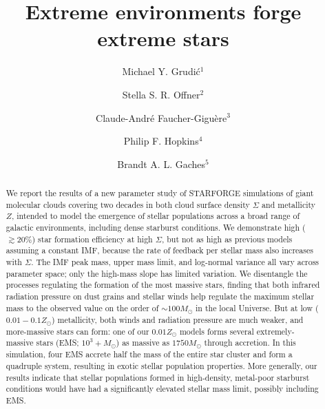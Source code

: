 \documentclass[apjl,twocolumn]{openjournal}
\begin{document}
\title{Extreme environments forge extreme stars}

\author{Michael Y. Grudi\'{c}$^{1}$}
\author{Stella S. R. Offner$^{2}$}
\author{Claude-Andr{\'e} Faucher-Gigu{\`e}re$^{3}$}
\author{Philip F. Hopkins$^{4}$}
\author{Brandt A. L. Gaches$^{5}$}



\begin{abstract}
We report the results of a new parameter study of \small{STARFORGE} simulations of giant molecular clouds covering two decades in both cloud surface density $\Sigma$ and metallicity $Z$, intended to model the emergence of stellar populations across a broad range of galactic environments, including dense starburst conditions. We demonstrate high ($\gtrsim 20\%$) star formation efficiency at high $\Sigma$, but not as high as previous models assuming a constant IMF, because the rate of feedback per stellar mass also increases with $\Sigma$. The IMF peak mass, upper mass limit, and log-normal variance all vary across parameter space; only the high-mass slope has limited variation. We disentangle the processes regulating the formation of the most massive stars, finding that both infrared radiation pressure on dust grains and stellar winds help regulate the maximum stellar mass to the observed value on the order of $\sim 100 M_\odot$ in the local Universe. But at low ($0.01-0.1Z_\odot$) metallicity, both winds and radiation pressure are much weaker, and more-massive stars can form: one of our $0.01 Z_\odot$ models forms several extremely-massive stars (EMS; $10^3+ M_\odot$) as massive as $1750 M_\odot$ through accretion. In this simulation, four EMS accrete half the mass of the entire star cluster and form a quadruple system, resulting in exotic stellar population properties. More generally, our results indicate that stellar populations formed in high-density, metal-poor starburst conditions would have had a significantly elevated stellar mass limit, possibly including EMS.
\end{abstract}
\end{document}
